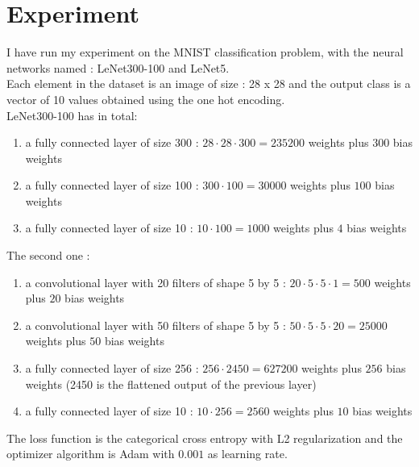 \documentclass[journal]{vgtc}                %
\begin{document}
\section{Experiment}
I have run my experiment on the MNIST classification problem, with the neural networks named : LeNet300-100 and LeNet5.\\Each element in the dataset is an image of size : 28 x 28 and the output class is a vector of 10 values obtained using the one hot encoding.\\LeNet300-100 has in total:
\begin{enumerate}
\item  a fully connected layer of size 300 : $28\cdot 28 \cdot 300 = 235200$ weights plus $300$ bias weights
\item  a fully connected layer of size 100 : $300\cdot 100 = 30000$ weights plus $100$ bias weights
\item  a fully connected layer of size 10 : $10\cdot 100 = 1000$ weights plus $4$ bias weights
\end{enumerate}
The second one :
\begin{enumerate}
\item  a convolutional layer with 20 filters of shape 5 by 5 : $20\cdot 5 \cdot 5 \cdot 1= 500$ weights plus $20$ bias weights
\item  a convolutional layer with 50 filters of shape 5 by 5 : $50\cdot 5 \cdot 5 \cdot 20= 25000$ weights plus $50$ bias weights
\item  a fully connected layer of size 256 : $256\cdot 2450 = 627200$ weights plus $256$ bias weights (2450 is the flattened output of the previous layer)
\item a fully connected layer of size 10 : $10\cdot256=2560$ weights plus $10$ bias weights
\end{enumerate}
The loss function is the categorical cross entropy with L2 regularization and the optimizer algorithm is Adam with $0.001$ as learning rate.
\end{document}
